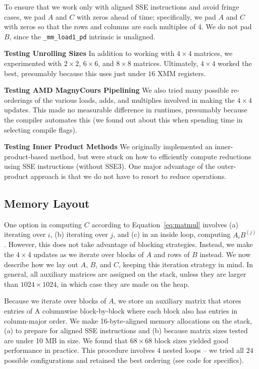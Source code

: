 \documentclass{article} %
\begin{document}
To ensure that we work only with aligned SSE instructions and avoid fringe
cases, we pad $A$ and $C$ with zeros ahead of time; specifically, we pad
$A$ and $C$ with zeros so that the rows and columns are each multiples of $4$.
We do not pad $B$, since the \texttt{\_mm\_load1\_pd} intrinsic is unaligned.

\textbf{Testing Unrolling Sizes} In addition to working with $4\times 4$ matrices, we
experimented with $2\times 2$, $6\times 6$, and $8\times 8$ matrices.
Ultimately, $4\times 4$ worked the best, presumably because this uses just under
$16$ XMM registers.

\textbf{Testing AMD MagnyCours Pipelining} We also tried many possible
re-orderings of the various loads, adds, and multiplies involved in making the
$4\times 4$ updates. This made no measurable difference in runtimes, presumably
because the compiler automates this (we found out about this when spending time
in selecting compile flags).

\textbf{Testing Inner Product Methods} We originally implemented an
inner-product-based method, but were stuck on how to efficiently compute
reductions using SSE instructions (without SSE3). One major advantage of the
outer-product approach is that we do not have to resort to reduce operations.

\subsection{Memory Layout}
\label{sec:mem-layout}
One option in computing $C$ according to Equation~\eqref{eq:matmul} involves
(a) iterating over $i$, (b) iterating over $j$, and (c) in an inside loop,
computing $A_i B^{(j)}$. However, this does not take advantage of blocking
strategies. Instead, we make the $4\times 4$ updates as we iterate
over blocks of $A$ and rows of $B$ instead. We now describe how we lay out $A$,
$B$, and $C$, keeping this iteration strategy in mind. In general, all auxiliary
matrices are assigned on the stack, unless they are larger than
$1024 \times 1024$, in which case they are made on the heap.

Because we iterate over blocks of $A$, we store an
auxiliary matrix that stores entries of A columnwise block-by-block where each
block also has entries in column-major order. We make 16-byte-aligned memory
allocations on the stack, (a) to prepare for aligned SSE instructions and (b)
because matrix sizes tested are under 10 MB in size. We found that $68\times 68$
block sizes yielded good performance in practice. This procedure involves $4$
nested loops -- we tried all $24$ possible configurations and retained the best
ordering (see code for specifics).
\end{document}
